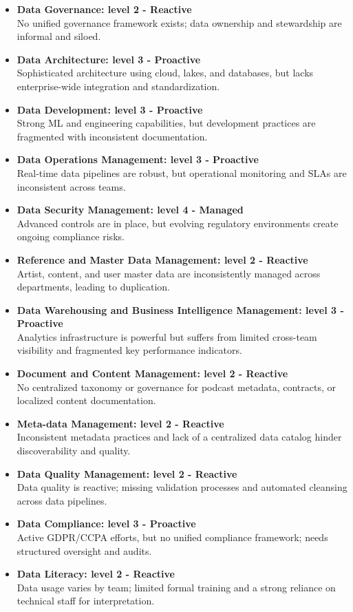 \documentclass[11pt,a4paper,computermodern]{article}
\begin{document}
\begin{itemize}[itemsep=5pt, parsep=0pt]
	\item \textbf{Data Governance: level 2 - Reactive}\\
	No unified governance framework exists; data ownership and stewardship are informal and siloed.
	\item \textbf{Data Architecture: level 3 - Proactive}\\
	Sophisticated architecture using cloud, lakes, and databases, but lacks enterprise-wide integration and standardization.
	\item \textbf{Data Development: level 3 - Proactive}\\
	Strong ML and engineering capabilities, but development practices are fragmented with inconsistent documentation.
	\item \textbf{Data Operations Management: level 3 - Proactive}\\
	Real-time data pipelines are robust, but operational monitoring and SLAs are inconsistent across teams.
	\item \textbf{Data Security Management: level 4 - Managed}\\
	Advanced controls are in place, but evolving regulatory environments create ongoing compliance risks.
	\item \textbf{Reference and Master Data Management: level 2 - Reactive}\\
	Artist, content, and user master data are inconsistently managed across departments, leading to duplication.
	\item \textbf{Data Warehousing and Business Intelligence Management: level 3 - Proactive}\\
	Analytics infrastructure is powerful but suffers from limited cross-team visibility and fragmented key performance indicators.
	\item \textbf{Document and Content Management: level 2 - Reactive}\\
	No centralized taxonomy or governance for podcast metadata, contracts, or localized content documentation.
	\item \textbf{Meta-data Management: level 2 - Reactive}\\
	Inconsistent metadata practices and lack of a centralized data catalog hinder discoverability and quality.
	\item \textbf{Data Quality Management: level 2 - Reactive}\\
	Data quality is reactive; missing validation processes and automated cleansing across data pipelines.
	\item \textbf{Data Compliance: level 3 - Proactive}\\
	Active GDPR/CCPA efforts, but no unified compliance framework; needs structured oversight and audits.
	\item \textbf{Data Literacy: level 2 - Reactive}\\
	Data usage varies by team; limited formal training and a strong reliance on technical staff for interpretation.
\end{itemize}
\end{document}
